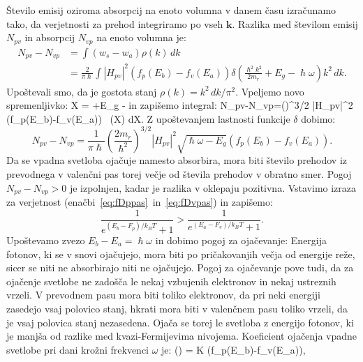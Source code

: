 Število emisij oziroma absorpcij na enoto volumna v danem času izračunamo tako,
da verjetnosti za prehod integriramo po vseh $\mathbf{k}$. Razlika med številom 
emisij $N_{pv}$ in absorpcij $N_{vp}$ na enoto volumna je:
\begin{align}  
N_{pv}-N_{vp}&=\int\left(w_s-w_a\right)\rho(k)\,dk  \nonumber \\
&=\frac{2}{\pi\hslash} \int |H_{pv}|^2\left(f_p(E_b)-f_v(E_a)\right)
\delta \left(\frac{\hslash^2 k^2}{2m_r}+E_g -\hslash\omega\right) k^2\,dk.
\label{6.7}
\end{align}
Upoštevali smo, da je gostota stanj $\rho(k)=k^2\, dk/\pi^2$. Vpeljemo
novo spremenljivko:
\beq
X = +E_g -\hslash\omega
\eeq
in zapišemo integral:
\beq
N_{pv}-N_{vp}=\left(\right)^{3/2}\!\!\int
|H_{pv}|^2 \left(f_p(E_b)-f_v(E_a)\right)
\,
\delta (X) dX.
\label{6.7a}
\eeq
Z upoštevanjem lastnosti funkcije $\delta$ dobimo:
\begin{equation}  
N_{pv}-N_{vp}=\frac{1}{\pi\hslash}\left(\frac{2m_r}{\hslash^2}\right)^{3/2}
|H_{pv}|^2 \sqrt{\hslash \omega-E_g}\left(f_p(E_b)-f_v(E_a)\right)\!.
\label{6.11}
\end{equation}
Da se vpadna svetloba ojačuje namesto absorbira, mora biti število prehodov
iz prevodnega v valenčni pas torej večje od števila prehodov v obratno smer. Pogoj
$N_{pv}-N_{vp} >0$ je izpolnjen, kadar je razlika v oklepaju pozitivna. Vstavimo izraza
za verjetnost (enačbi~\ref{eq:fDppas}~in~\ref{eq:fDvpas}) in zapišemo:
\begin{equation}  
\frac{1}{e^{(E_b-F_{p})/k_B T}+1}>\frac{1}{e^{(E_a-F_v)/k_B T}+1}.
\label{6.12}
\end{equation}
Upoštevamo zvezo $E_b-E_a = \hslash \omega$ in dobimo 
pogoj za ojačevanje:
Energija fotonov, ki se v snovi ojačujejo, mora biti po pričakovanjih večja od
energije reže, sicer se niti ne absorbirajo niti ne ojačujejo. Pogoj za ojačevanje pove tudi, 
da za ojačenje svetlobe ne zadošča le nekaj vzbujenih elektronov in nekaj ustreznih vrzeli. 
V prevodnem pasu mora biti toliko elektronov, da pri neki energiji zasedejo vsaj polovico stanj, 
hkrati  mora biti v valenčnem pasu toliko vrzeli, da je vsaj polovica stanj nezasedena.
Ojača se torej le svetloba z energijo fotonov, ki je manjša od razlike med kvazi-Fermijevima
nivojema. Koeficient ojačenja vpadne svetlobe pri dani krožni
frekvenci $\omega$ je:
\beq
\gamma(\omega) = K \left(f_p(E_b)-f_v(E_a)\right)\!,
